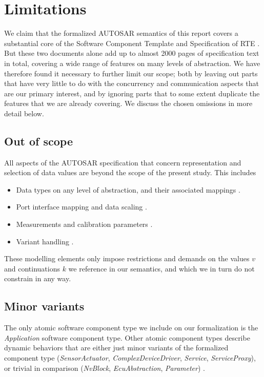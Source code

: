 \documentclass[10pt,conference]{IEEEtran}
\begin{document}
\section{Limitations} \label{sec:Lim}

We claim that the formalized AUTOSAR semantics of this report covers a substantial core of the Software Component Template and Specification of RTE \cite{AR:SWC, AR:RTE}. But these two documents alone add up to almost 2000 pages of specification text in total, covering a wide range of features on many levels of abstraction. We have therefore found it necessary to further limit our scope; both by leaving out parts that have very little to do with the concurrency and communication aspects that are our primary interest, and by ignoring parts that to some extent duplicate the features that we are already covering. We discuss the chosen omissions in more detail below.

\subsection{Out of scope}

All aspects of the AUTOSAR specification that concern representation and selection of data values are beyond the scope of the present study. This includes
\begin{itemize}
\item Data types on any level of abstraction, and their associated mappings \cite[ch.~5]{AR:SWC}.
\item Port interface mapping and data scaling \cite[ch.~4.3]{AR:SWC}.
\item Measurements and calibration parameters \cite[ch.~2.2]{AR:SWC}.
\item Variant handling \cite[ch.~2.4]{AR:SWC}.
\end{itemize}
These modelling elements only impose restrictions and demands on the values $v$ and continuations $k$ we reference in our semantics, and which we in turn do not constrain in any way.


\subsection{Minor variants}

The only atomic software component type we include on our formalization is the \emph{Application} software component type. Other atomic component types describe dynamic behaviors that are either just minor variants of the formalized component type (\emph{SensorActuator}, \emph{ComplexDeviceDriver}, \emph{Service}, \emph{ServiceProxy}), or trivial in comparison (\emph{NvBlock}, \emph{EcuAbstraction}, \emph{Parameter}) \cite[ch.~3.2.3]{AR:SWC}.
\end{document}
